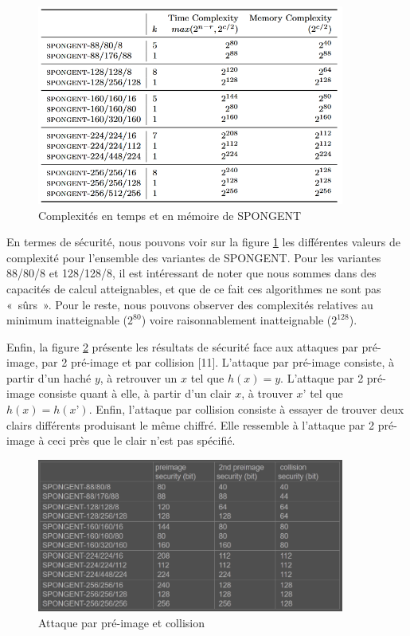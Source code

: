 		\begin{figure}[h]
			\centering
			\includegraphics[width=0.9\textwidth]{imgs/Spongent/timeComplexity.png}
			\caption{Complexités en temps et en mémoire de SPONGENT}
			\label{timeComplexity}
		\end{figure}

		En termes de sécurité, nous pouvons voir sur la figure \ref{timeComplexity} les différentes valeurs de complexité pour l’ensemble des variantes de SPONGENT.
		Pour les variantes 88/80/8 et 128/128/8, il est intéressant de noter que nous sommes dans des capacités de calcul atteignables, et que de ce fait ces algorithmes ne sont pas « sûrs ».
		Pour le reste, nous pouvons observer des complexités relatives au minimum inatteignable ($2^{80}$) voire raisonnablement inatteignable ($2^{128}$).

		Enfin, la figure \ref{attaquePreImage} présente les résultats de sécurité face aux attaques par pré-image, par 2 pré-image et par collision [11].
		L’attaque par pré-image consiste, à partir d’un haché $y$, à retrouver un $x$ tel que $h(x) = y$.
		L’attaque par 2 pré-image consiste quant à elle, à partir d’un clair $x$, à trouver $x’$ tel que $h(x) = h(x’)$.
		Enfin, l’attaque par collision consiste à essayer de trouver deux clairs différents produisant le même chiffré.
		Elle ressemble à l’attaque par 2 pré-image à ceci près que le clair n’est pas spécifié.

		\begin{figure}[!h]
			\centering
			\includegraphics[width=0.9\textwidth, height=0.3\textheight]{imgs/Spongent/attaquePreImage.png}
			\caption{Attaque par pré-image et collision}
			\label{attaquePreImage}
		\end{figure}

